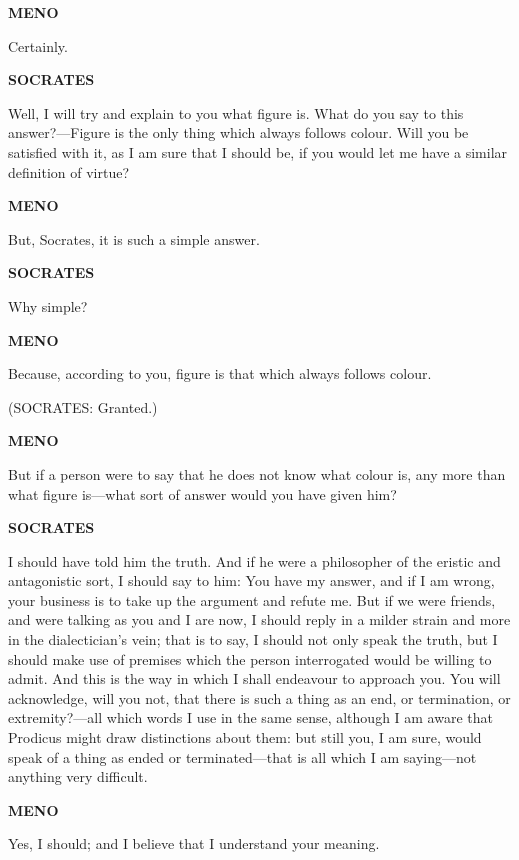\documentclass[11pt,letter]{article}
\begin{document}
\par \textbf{MENO}
\par   Certainly.

\par \textbf{SOCRATES}
\par   Well, I will try and explain to you what figure is. What do you say to this answer?—Figure is the only thing which always follows colour. Will you be satisfied with it, as I am sure that I should be, if you would let me have a similar definition of virtue?

\par \textbf{MENO}
\par   But, Socrates, it is such a simple answer.

\par \textbf{SOCRATES}
\par   Why simple?

\par \textbf{MENO}
\par   Because, according to you, figure is that which always follows colour.

\par  (SOCRATES: Granted.)

\par \textbf{MENO}
\par   But if a person were to say that he does not know what colour is, any more than what figure is—what sort of answer would you have given him?

\par \textbf{SOCRATES}
\par   I should have told him the truth. And if he were a philosopher of the eristic and antagonistic sort, I should say to him:  You have my answer, and if I am wrong, your business is to take up the argument and refute me. But if we were friends, and were talking as you and I are now, I should reply in a milder strain and more in the dialectician's vein; that is to say, I should not only speak the truth, but I should make use of premises which the person interrogated would be willing to admit. And this is the way in which I shall endeavour to approach you. You will acknowledge, will you not, that there is such a thing as an end, or termination, or extremity?—all which words I use in the same sense, although I am aware that Prodicus might draw distinctions about them:  but still you, I am sure, would speak of a thing as ended or terminated—that is all which I am saying—not anything very difficult.

\par \textbf{MENO}
\par   Yes, I should; and I believe that I understand your meaning.
\end{document}
